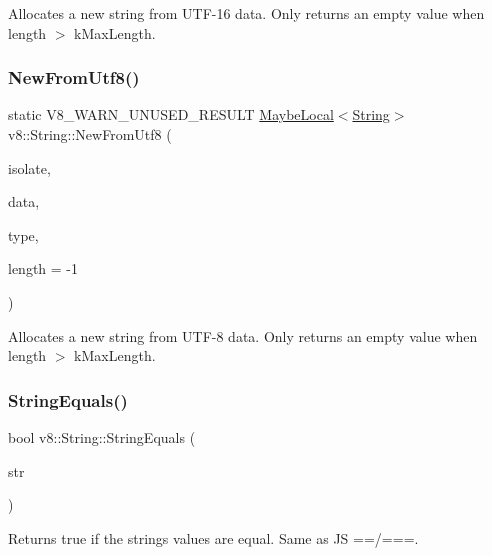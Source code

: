 Allocates a new string from U\+T\+F-\/16 data. Only returns an empty value when length $>$ k\+Max\+Length. \mbox{\label{classv8_1_1String_a851bcf20fecb01b97f14131ce609f701}} 
\subsubsection{\texorpdfstring{New\+From\+Utf8()}{NewFromUtf8()}}
{\footnotesize\ttfamily static V8\+\_\+\+W\+A\+R\+N\+\_\+\+U\+N\+U\+S\+E\+D\+\_\+\+R\+E\+S\+U\+LT \mbox{\hyperlink{classv8_1_1MaybeLocal}{Maybe\+Local}}$<$\mbox{\hyperlink{classv8_1_1String}{String}}$>$ v8\+::\+String\+::\+New\+From\+Utf8 (\begin{DoxyParamCaption}\item[{Isolate $\ast$}]{isolate,  }\item[{const char $\ast$}]{data,  }\item[{\mbox{\hyperlink{namespacev8_ac9163ab12fb3b2a95907a3a0367c6095}{v8\+::\+New\+String\+Type}}}]{type,  }\item[{int}]{length = {\ttfamily -\/1} }\end{DoxyParamCaption})\hspace{0.3cm}{\ttfamily [static]}}

Allocates a new string from U\+T\+F-\/8 data. Only returns an empty value when length $>$ k\+Max\+Length. \mbox{\label{classv8_1_1String_aaca2109ba1c2c50e45d40d7b79edb01c}} 
\subsubsection{\texorpdfstring{String\+Equals()}{StringEquals()}}
{\footnotesize\ttfamily bool v8\+::\+String\+::\+String\+Equals (\begin{DoxyParamCaption}\item[{\mbox{\hyperlink{classv8_1_1Local}{Local}}$<$ \mbox{\hyperlink{classv8_1_1String}{String}} $>$}]{str }\end{DoxyParamCaption})}

Returns true if the strings values are equal. Same as JS ==/===. \mbox{\label{classv8_1_1String_af99433ee51ed45337e5b4536bd28a834}} 
